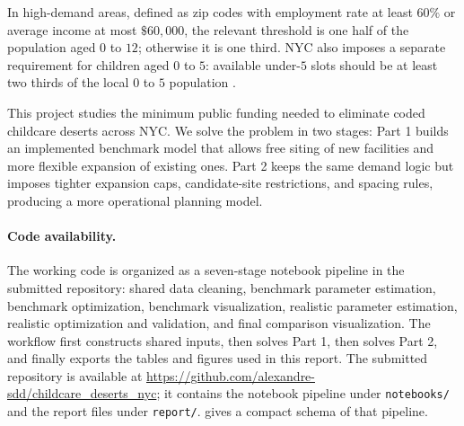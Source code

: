 \documentclass[11pt]{article}
\begin{document}
In high-demand areas, defined as zip codes with employment rate at least \(60\%\) or average income at most \(\$60{,}000\), the relevant threshold is one half of the population aged \(0\) to \(12\); otherwise it is one third. NYC also imposes a separate requirement for children aged \(0\) to \(5\): available under-\(5\) slots should be at least two thirds of the local \(0\) to \(5\) population \cite{assignment}.

This project studies the minimum public funding needed to eliminate coded childcare deserts across NYC. We solve the problem in two stages: Part 1 builds an implemented benchmark model that allows free siting of new facilities and more flexible expansion of existing ones. Part 2 keeps the same demand logic but imposes tighter expansion caps, candidate-site restrictions, and spacing rules, producing a more operational planning model.

\paragraph{Code availability.}
The working code is organized as a seven-stage notebook pipeline in the submitted repository: shared data cleaning, benchmark parameter estimation, benchmark optimization, benchmark visualization, realistic parameter estimation, realistic optimization and validation, and final comparison visualization. The workflow first constructs shared inputs, then solves Part 1, then solves Part 2, and finally exports the tables and figures used in this report. The submitted repository is available at \url{https://github.com/alexandre-sdd/childcare_deserts_nyc}; it contains the notebook pipeline under \texttt{notebooks/} and the report files under \texttt{report/}.  gives a compact schema of that pipeline.
\end{document}
